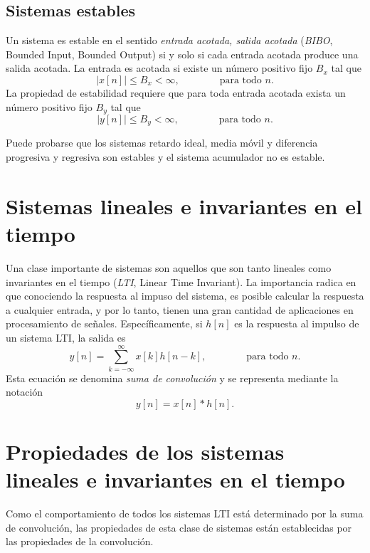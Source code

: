 \documentclass[a4paper]{report}
\begin{document}
\subsection{Sistemas estables}\label{sec:seq_and_sys_stable_system}

Un sistema es estable en el sentido \emph{entrada acotada, salida acotada} (\emph{BIBO}, Bounded Input, Bounded Output) si y solo si cada entrada acotada produce una salida acotada. La entrada es acotada si existe un número positivo fijo \(B_x\) tal que 
\[
 |x[n]|\leq B_x<\infty,
 \qquad\qquad\textrm{para todo } n.
\]
La propiedad de estabilidad requiere que para toda entrada acotada exista un número positivo fijo \(B_y\) tal que 
\[
 |y[n]|\leq B_y<\infty,
 \qquad\qquad\textrm{para todo } n.
\]

Puede probarse que los sistemas retardo ideal, media móvil y diferencia progresiva y regresiva son estables y el sistema acumulador no es estable.
 
\section{Sistemas lineales e invariantes en el tiempo} 
 
Una clase importante de sistemas son aquellos que son tanto lineales como invariantes en el tiempo (\emph{LTI}, Linear Time Invariant). La importancia radica en que conociendo la respuesta al impuso del sistema, es posible calcular la respuesta a cualquier entrada, y por lo tanto, tienen una gran cantidad de aplicaciones en procesamiento de señales. Específicamente, si \(h[n]\) es la respuesta al impulso de un sistema LTI, la salida es
\begin{equation}\label{eq:seq_and_sys_convolution_definition}
 y[n]=\sum_{k=-\infty}^\infty x[k]h[n-k],
 \qquad\qquad\textrm{para todo }n.
\end{equation}
Esta ecuación se denomina \emph{suma de convolución} y se representa mediante la notación
\[
 y[n]=x[n]*h[n].
\]

\section{Propiedades de los sistemas lineales e invariantes en el tiempo}\label{sec:seq_and_sys_lti_properties}  
 
Como el comportamiento de todos los sistemas LTI está determinado por la suma de convolución, las propiedades de esta clase de sistemas están establecidas por las propiedades de la convolución.  
 
\end{document}
